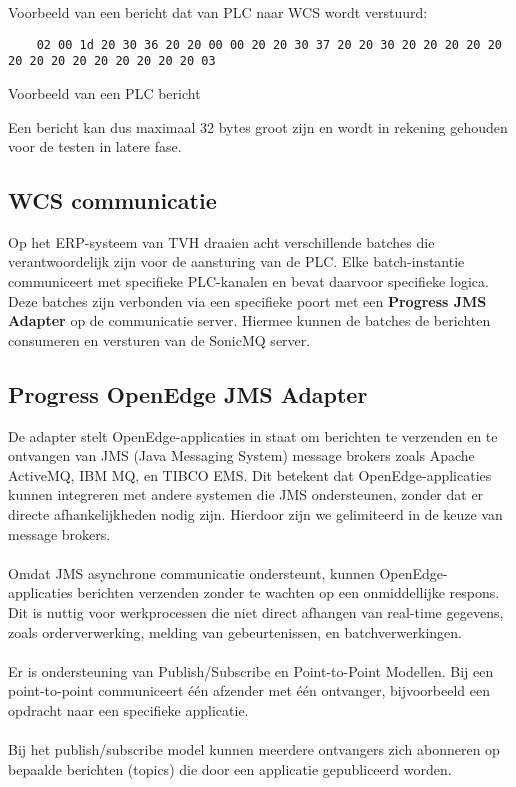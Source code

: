 Voorbeeld van een bericht dat van PLC naar WCS wordt verstuurd: 
\begin{listing}[h!]
  \begin{verbatim}
    02 00 1d 20 30 36 20 20 00 00 20 20 30 37 20 20 30 20 20 20 20 20 20 20 20 20 20 20 20 20 20 03
  \end{verbatim}
  \caption[Voorbeeld PLC bericht]{Voorbeeld van een PLC bericht}
\end{listing}

Een bericht kan dus maximaal 32 bytes groot zijn en wordt in rekening gehouden voor de testen in latere fase.

\subsection{WCS communicatie} 
Op het ERP-systeem van TVH draaien acht verschillende batches die verantwoordelijk zijn voor de aansturing van de PLC. 
Elke batch-instantie communiceert met specifieke PLC-kanalen en bevat daarvoor specifieke logica.
Deze batches zijn verbonden via een specifieke poort met een \textbf{Progress JMS Adapter} op de communicatie server.
Hiermee kunnen de batches de berichten consumeren en versturen van de SonicMQ server.

\subsection{Progress OpenEdge JMS Adapter}
De adapter stelt OpenEdge-applicaties in staat om berichten te verzenden en te ontvangen van JMS (Java Messaging System)
message brokers zoals Apache ActiveMQ, IBM MQ, en TIBCO EMS. 
Dit betekent dat OpenEdge-applicaties kunnen integreren met andere systemen die JMS ondersteunen, 
zonder dat er directe afhankelijkheden nodig zijn.
Hierdoor zijn we gelimiteerd in de keuze van message brokers.
\\
\\
Omdat JMS asynchrone communicatie ondersteunt, kunnen OpenEdge-applicaties berichten verzenden zonder te wachten op een onmiddellijke respons.
Dit is nuttig voor werkprocessen die niet direct afhangen van real-time gegevens, zoals orderverwerking, 
melding van gebeurtenissen, en batchverwerkingen.
\\\\
Er is ondersteuning van Publish/Subscribe en Point-to-Point Modellen.
Bij een point-to-point communiceert één afzender met één ontvanger, bijvoorbeeld een opdracht naar een specifieke applicatie.
\\\\
Bij het publish/subscribe model kunnen meerdere ontvangers zich abonneren op bepaalde berichten (topics) die door een applicatie gepubliceerd worden.

